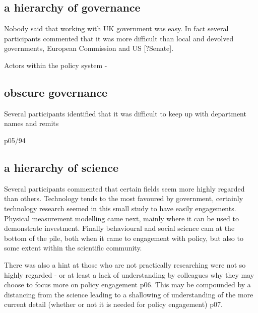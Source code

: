 \subsection{a hierarchy of governance}
Nobody said that working with UK government was easy. In fact several participants commented that it was more difficult than local and devolved governments, European Commission and US [?Senate]. 

Actors within the policy system - 

\subsection{obscure governance}

Several participants identified that it was difficult to keep up with department names and remits 


p05/94

\subsection{a hierarchy of science}
Several participants commented that certain fields seem more highly regarded than others. Technology tends to the most favoured by government, certainly technology research seemed in this small study to have easily engagements. Physical measurement modelling came next, mainly where it can be used to demonstrate investment. Finally behavioural and social science cam at the bottom of the pile, both when it came to engagement with policy, but also to some extent within the scientific community.

There was also a hint at those who are not practically researching were not so highly regarded - or at least a lack of understanding by colleagues why they may choose to focus more on policy engagement p06. This may be compounded by a distancing from the science leading to a shallowing of understanding of the more current detail (whether or not it is needed for policy engagement) p07. 

